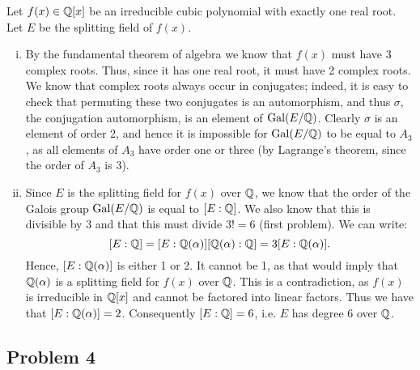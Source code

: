 \documentclass{../../mathnotes}
\begin{document}
Let $f(x)\in \mathbb{Q}[x]$ be an irreducible cubic polynomial with exactly one real root. Let $E$ be the splitting field of $f(x)$.

\begin{enumerate}[(i)]
    \item By the fundamental theorem of algebra we know that $f(x)$ must have 3 complex roots. Thus, since it has
        one real root, it must have 2 complex roots. We know that complex roots always occur in conjugates; indeed,
        it is easy to check that permuting these two conjugates is an automorphism, and thus $\sigma$, the conjugation
        automorphism, is an element of $\operatorname{Gal}(E/\mathbb{Q})$. Clearly $\sigma$ is an element of order 2, and hence it is impossible for
        $\operatorname{Gal}(E/\mathbb{Q})$ to be equal to $A_3$, as all elements of $A_3$ have order one or three (by Lagrange's theorem, since the
        order of $A_3$ is 3).
    \item Since $E$ is the splitting field for $f(x)$ over $\mathbb{Q}$, we know that the order of the Galois group $\operatorname{Gal}(E/\mathbb{Q})$
        is equal to $[E:\mathbb{Q}]$. We also know that this is divisible by 3 and that this must divide $3!=6$ (first problem).
        We can write:
        \[ [E:\mathbb{Q}]=[E:\mathbb{Q}(\alpha)][\mathbb{Q}(\alpha):\mathbb{Q}]=3[E:\mathbb{Q}(\alpha)]. \]
        Hence, $[E:\mathbb{Q}(\alpha)]$ is either 1 or 2. It cannot be 1, as that would imply that $\mathbb{Q}(\alpha)$ is a splitting field
        for $f(x)$ over $\mathbb{Q}$. This is a contradiction, as $f(x)$ is irreducible in $\mathbb{Q}[x]$ and cannot be factored into linear factors.
        Thus we have that $[E:\mathbb{Q}(\alpha)]=2$. Consequently $[E:\mathbb{Q}]=6$, i.e. $E$ has degree 6 over $\mathbb{Q}$.
\end{enumerate}

\subsection*{Problem 4}
\end{document}
